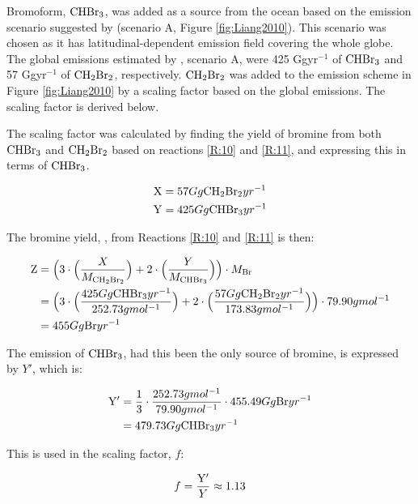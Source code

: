 \medskip

Bromoform, $\mathrm{CHBr_3}$, was added as a source from the ocean based on the emission scenario suggested by \cite{Liang2010} (scenario A, Figure \ref{fig:Liang2010}). This scenario was chosen as it has latitudinal-dependent emission field covering the whole globe. The global emissions estimated by \cite{Liang2010}, scenario A, were 425 Ggyr$^{-1}$ of $\mathrm{CHBr_3}$ and 57 Ggyr$^{-1}$ of $\mathrm{CH_2Br_2}$, respectively. $\mathrm{CH_2Br_2}$ was added to the emission scheme in Figure \ref{fig:Liang2010} by a scaling factor based on the global emissions. The scaling factor is derived below.

\medskip

The scaling factor was calculated by finding the yield of bromine from both $\mathrm{CHBr_3}$ and $\mathrm{CH_2Br_2}$ based on reactions \ref{R:10} and \ref{R:11}, and expressing this in terms of $\mathrm{CHBr_3}$. 

\begin{align*}
    \mathrm{X} & = 57 Gg \mathrm{CH_2Br_2}yr^{-1} \\
    \mathrm{Y} & = 425 Gg \mathrm{CHBr_3}yr^{-1} 
\end{align*}

The bromine yield, , from Reactions \ref{R:10} and \ref{R:11} is then: 

\begin{align*}
    \mathrm{Z} & = \Big(3\cdot\Big(\frac{X}{M_{\mathrm{CH_2Br_2}}}\Big) + 2\cdot\Big(\frac{Y}{M_{\mathrm{CHBr_3}}}\Big)\Big)\cdot M_{\mathrm{Br}} \\
    & = \Big(3\cdot\Big(\frac{425 Gg \mathrm{CHBr_3}yr^{-1}}{252.73 g mol^{-1}}\Big) + 2\cdot\Big(\frac{57 Gg \mathrm{CH_2Br_2}yr^{-1}}{173.83 g mol^{-1}}\Big)\Big)\cdot79.90 g mol^{-1} \\
    & = 455 Gg\mathrm{Br}yr^{-1}
\end{align*}

The emission of $\mathrm{CHBr_3}$, had this been the only source of bromine, is expressed by $Y'$, which is: 

\begin{align*}
    \mathrm{Y'} & = \frac{1}{3}\cdot\frac{252.73 g mol^{-1}}{79.90 g mol^{-1}}\cdot455.49Gg\mathrm{Br}yr^{-1} \\
    & = 479.73 Gg \mathrm{CHBr_3}yr^{-1}
\end{align*}

This is used in the scaling factor, $f$:

\begin{equation*}
    f = \frac{\mathrm{Y'}}{Y} \approx 1.13
\end{equation*}


